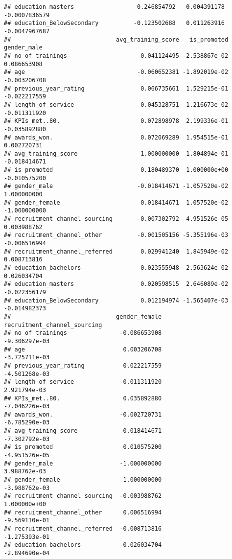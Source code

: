 \documentclass[
]{article}
\begin{document}
\begin{verbatim}
## education_masters                  0.246854792   0.004391178 -0.0007836579
## education_BelowSecondary          -0.123502688   0.011263916 -0.0047967687
##                              avg_training_score   is_promoted  gender_male
## no_of_trainings                     0.041124495 -2.538867e-02  0.086653908
## age                                -0.060652381 -1.892019e-02 -0.003206708
## previous_year_rating                0.066735661  1.529215e-01 -0.022217559
## length_of_service                  -0.045328751 -1.216673e-02 -0.011311920
## KPIs_met..80.                       0.072898978  2.199336e-01 -0.035892880
## awards_won.                         0.072069289  1.954515e-01  0.002720731
## avg_training_score                  1.000000000  1.804894e-01 -0.018414671
## is_promoted                         0.180489370  1.000000e+00 -0.010575200
## gender_male                        -0.018414671 -1.057520e-02  1.000000000
## gender_female                       0.018414671  1.057520e-02 -1.000000000
## recruitment_channel_sourcing       -0.007302792 -4.951526e-05  0.003988762
## recruitment_channel_other          -0.001505156 -5.355196e-03 -0.006516994
## recruitment_channel_referred        0.029941240  1.845949e-02  0.008713816
## education_bachelors                -0.023555948 -2.563624e-02  0.026034704
## education_masters                   0.020598515  2.646089e-02 -0.022356179
## education_BelowSecondary            0.012194974 -1.565407e-03 -0.014982373
##                              gender_female recruitment_channel_sourcing
## no_of_trainings               -0.086653908                -9.306297e-03
## age                            0.003206708                -3.725711e-03
## previous_year_rating           0.022217559                -4.501268e-03
## length_of_service              0.011311920                 2.921794e-03
## KPIs_met..80.                  0.035892880                -7.046226e-03
## awards_won.                   -0.002720731                -6.785290e-03
## avg_training_score             0.018414671                -7.302792e-03
## is_promoted                    0.010575200                -4.951526e-05
## gender_male                   -1.000000000                 3.988762e-03
## gender_female                  1.000000000                -3.988762e-03
## recruitment_channel_sourcing  -0.003988762                 1.000000e+00
## recruitment_channel_other      0.006516994                -9.569110e-01
## recruitment_channel_referred  -0.008713816                -1.275393e-01
## education_bachelors           -0.026034704                -2.894690e-04

\end{verbatim}
\end{document}
